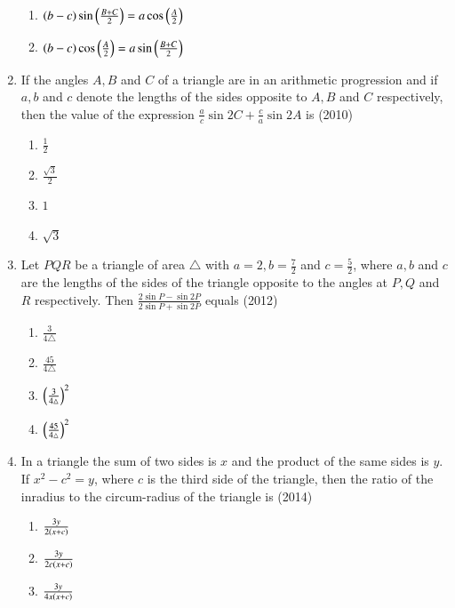 \begin{enumerate}[label=\thesubsection.\arabic*,ref=\thesubsection.\theenumi]
\begin{multicols}{2}
\begin{enumerate}
\item $\left(b-c\right) \sin \left(\frac{B+C}{2}\right) = a \cos \left(\frac{A}{2}\right)$
\item $\left(b-c\right) \cos \left(\frac{A}{2}\right) = a \sin \left(\frac{B+C}{2}\right)$
\end{enumerate}
\end{multicols}
%
\item If the angles $A, B$ and $C$ of a triangle are in an arithmetic progression and if ${a}, {b}$ and ${c}$ denote the lengths of the sides opposite to $A, B$ and $C$ respectively, then the value of the expression $\frac{a}{c}\sin 2C + \frac{c}{a} \sin 2A$ is
\hfill (2010)
\begin{multicols}{4}
\begin{enumerate}
\item $\frac{1}{2}$
\item $\frac{\sqrt{3}}{2}$
\item $1$
\item $\sqrt{3}$
\end{enumerate}
\end{multicols}
%
\item Let $PQR$ be a triangle of area $\triangle$ with $a=2, b= \frac{7}{2}$ and $c=\frac{5}{2}$, where ${a}, {b}$ and ${c}$ are the lengths of the sides of the triangle opposite to the angles at $P, Q$ and $R$ respectively. Then $\frac{2\sin P - \sin 2P}{2\sin P + \sin 2P}$ equals
\hfill (2012)
\begin{multicols}{4}
\begin{enumerate}
\item $\frac{3}{4\triangle}$
\item $\frac{45}{4\triangle}$
\item $\left(\frac{3}{4\triangle}\right)^2$
\item $\left(\frac{45}{4\triangle}\right)^2$
\end{enumerate}
\end{multicols}
%
\item In a triangle the sum of two sides is ${x}$ and the product of the same sides is ${y}$. If $x^2-c^2=y$, where ${c}$ is the third side of the triangle, then the ratio of the inradius to the circum-radius of the triangle is
\hfill (2014)
\begin{multicols}{2}
\begin{enumerate}
\item $\frac{3y}{2\left(x+c\right)}$
\item $\frac{3y}{2c\left(x+c\right)}$
\item $\frac{3y}{4x\left(x+c\right)}$

\end{enumerate}
\end{multicols}
\end{enumerate}
